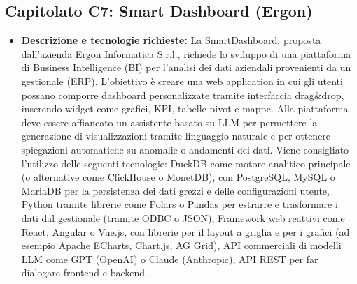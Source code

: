 \documentclass[12pt,a4paper]{article}
\newcommand{\tightlist}{\setlength{\itemsep}{1pt}\setlength{\parskip}{0pt}}
\begin{document}
\hypertarget{capitolato-c7}{%
\subsection{Capitolato C7: Smart Dashboard (Ergon)}}
\begin{itemize}
\tightlist
\item \textbf{Descrizione e tecnologie richieste:} La SmartDashboard, proposta dall'azienda Ergon Informatica S.r.l., richiede lo sviluppo di una piattaforma di Business Intelligence (BI) per l'analisi dei dati aziendali provenienti da un gestionale (ERP).
L'obiettivo è creare una web application in cui gli utenti possano comporre dashboard personalizzate tramite interfaccia drag\&drop, inserendo widget come grafici, KPI, tabelle pivot e mappe. Alla piattaforma deve essere affiancato un assistente basato su LLM per permettere la generazione di visualizzazioni tramite linguaggio naturale e per ottenere spiegazioni automatiche su anomalie o andamenti dei dati.
Viene consigliato l'utilizzo delle seguenti tecnologie:
 DuckDB come motore analitico principale (o alternative come ClickHouse o MonetDB), con PostgreSQL, MySQL o MariaDB per la persistenza dei dati grezzi e delle configurazioni utente, Python tramite librerie come Polars o Pandas per estrarre e trasformare i dati dal gestionale (tramite ODBC o JSON), Framework web reattivi come React, Angular o Vue.js, con librerie per il layout a griglia e per i grafici (ad esempio Apache ECharts, Chart.js, AG Grid), API commerciali di modelli LLM come GPT (OpenAI) o Claude (Anthropic), API REST per far dialogare frontend e backend.


\end{itemize}
\end{document}
